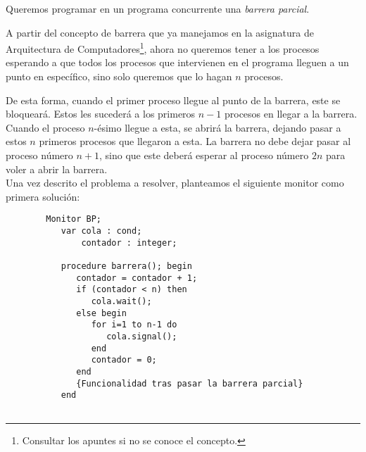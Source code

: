 \begin{ejemplo}
    Queremos programar en un programa concurrente una \textit{barrera parcial}.

    A partir del concepto de barrera que ya manejamos en la asignatura de Arquitectura de Computadores\footnote{Consultar los apuntes si no se conoce el concepto.}, ahora no queremos tener a los procesos esperando a que todos los procesos que intervienen en el programa lleguen a un punto en específico, sino solo queremos que lo hagan $n$ procesos.

    De esta forma, cuando el primer proceso llegue al punto de la barrera, este se bloqueará. Estos les sucederá a los primeros $n-1$ procesos en llegar a la barrera. Cuando el proceso $n$-ésimo llegue a esta, se abrirá la barrera, dejando pasar a estos $n$ primeros procesos que llegaron a esta. La barrera no debe dejar pasar al proceso número $n+1$, sino que este deberá esperar al proceso número $2n$ para voler a abrir la barrera.\\

    Una vez descrito el problema a resolver, planteamos el siguiente monitor como primera solución:
    \begin{verbatim}
        Monitor BP;
           var cola : cond;
               contador : integer;

           procedure barrera(); begin
              contador = contador + 1;
              if (contador < n) then
                 cola.wait();
              else begin
                 for i=1 to n-1 do
                    cola.signal();
                 end
                 contador = 0;
              end
              {Funcionalidad tras pasar la barrera parcial}
           end


\end{verbatim}
\end{ejemplo}
